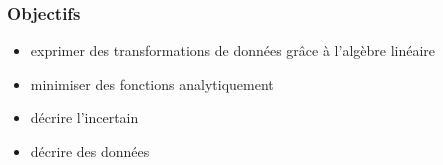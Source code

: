 
\begin{frame}
  \frametitle{Objectifs}
  \begin{itemize}
  \item exprimer des transformations de données grâce à
    l'algèbre linéaire
  \item minimiser des fonctions analytiquement
  \item décrire l'incertain
  \item décrire des données
  \end{itemize}
\end{frame}
